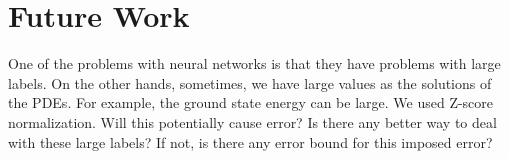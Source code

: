 \section{Future Work}
One of the problems with neural networks is that they have problems with large labels. On the other hands, sometimes, we have large values as the solutions of the PDEs. For example, the ground state energy can be large. We used Z-score normalization. Will this potentially cause error? Is there any better way to deal with these large labels? If not, is there any error bound for this imposed error?\\